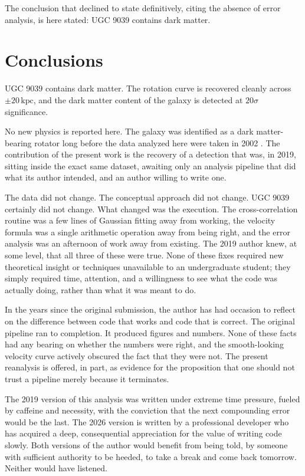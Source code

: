 \documentclass{aa}
\begin{document}
The conclusion that \citet{fraustro} declined to state definitively, citing the absence of error analysis, is here stated: UGC 9039 contains dark matter.

\section{Conclusions}
UGC 9039 contains dark matter. The rotation curve is recovered cleanly across $\pm 20\,\text{kpc}$, and the dark matter content of the galaxy is detected at $20\sigma$ significance.

No new physics is reported here. The galaxy was identified as a dark matter-bearing rotator long before the data analyzed here were taken in 2002 \citep{catinella}. The contribution of the present work is the recovery of a detection that was, in 2019, sitting inside the exact same dataset, awaiting only an analysis pipeline that did what its author intended, and an author willing to write one.

The data did not change. The conceptual approach did not change. UGC 9039 certainly did not change. What changed was the execution. The cross-correlation routine was a few lines of Gaussian fitting away from working, the velocity formula was a single arithmetic operation away from being right, and the error analysis was an afternoon of work away from existing. The 2019 author knew, at some level, that all three of these were true. None of these fixes required new theoretical insight or techniques unavailable to an undergraduate student; they simply required time, attention, and a willingness to see what the code was actually doing, rather than what it was meant to do.

In the years since the original submission, the author has had occasion to reflect on the difference between code that works and code that is correct. The original pipeline ran to completion. It produced figures and numbers. None of these facts had any bearing on whether the numbers were right, and the smooth-looking velocity curve actively obscured the fact that they were not. The present reanalysis is offered, in part, as evidence for the proposition that one should not trust a pipeline merely because it terminates.

The 2019 version of this analysis was written under extreme time pressure, fueled by caffeine and necessity, with the conviction that the next compounding error would be the last. The 2026 version is written by a professional developer who has acquired a deep, consequential appreciation for the value of writing code slowly. Both versions of the author would benefit from being told, by someone with sufficient authority to be heeded, to take a break and come back tomorrow. Neither would have listened.
\end{document}
